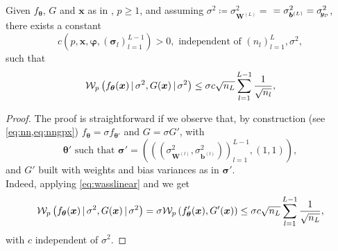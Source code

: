 \begin{lemma} \label{lem:priornngpsigma}
	Given $f_{\bm{\theta}}$, $G$ and $\bm{x}$ as in , $p \geq 1$, and assuming $\sigma^2 \coloneqq \sigma_{\bm{W}^{(L)}}^2 =$ $= \sigma_{\bm{b}^{(L)}}^2 = \sigmay^2$, there exists a constant
	\begin{equation*}
		c\left(p, \bm{x}, \bm{\varphi}, (\bm{\sigma}_l)_{l = 1}^{L - 1}\right) > 0, \text{ independent of } \left(n_l\right)_{l = 1}^L, \sigma^2,
	\end{equation*}
	such that
	\begin{equation*}
		\wass[p]{f_{\bm{\theta}}(\bm{x}) \given \sigma^2}{G(\bm{x}) \given \sigma^2} \leq \sigma c \sqrt{n_L} \sum_{l = 1}^{L - 1} \frac{1}{\sqrt{n_l}},
	\end{equation*}
\end{lemma}
\begin{proof}
	The proof is straightforward if we observe that, by construction (see \cref{eq:nn,eq:nngpx}) $f_{\bm{\theta}} = \sigma f_{\bm{\theta}'}$ and $G = \sigma  G'$, with 
	\begin{equation} \label{eq:thetaprime}
		\bm{\theta}' \text{ such that } \bm{\sigma}' = \left(\left(\left(\sigma_{\bm{W}^{(l)}}^2, \sigma_{\bm{b}^{(l)}}^2\right)\right)_{l = 1}^{L - 1}, (1, 1)\right),
	\end{equation}
	and $G'$ built with weights and bias variances as in $\bm{\sigma}'$. \\
	Indeed, applying \cref{eq:wasslinear} and  we get
	\begin{equation*}
		\wass[p]{f_{\bm{\theta}}(\bm{x}) \given \sigma^2}{G(\bm{x}) \given \sigma^2} =\sigma \wass[p]{f_{\bm{\theta}}'(\bm{x})}{G'(\bm{x})} \leq \sigma c \sqrt{n_L} \sum_{l = 1}^{L - 1} \frac{1}{\sqrt{n_L}}, 
	\end{equation*}
	with $c$ independent of $\sigma^2$.
\end{proof}

